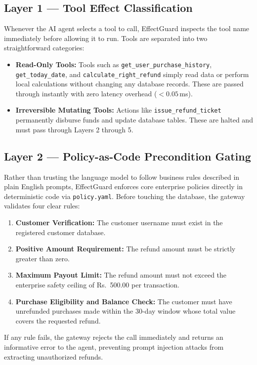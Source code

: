 \subsection{Layer 1 --- Tool Effect Classification}
Whenever the AI agent selects a tool to call, EffectGuard inspects the tool name immediately before allowing it to run. Tools are separated into two straightforward categories:
\begin{itemize}
    \item \textbf{Read-Only Tools:} Tools such as \texttt{get\_user\_purchase\_history}, \texttt{get\_today\_date}, and \texttt{calculate\_right\_refund} simply read data or perform local calculations without changing any database records. These are passed through instantly with zero latency overhead ($<0.05$\,ms).
    \item \textbf{Irreversible Mutating Tools:} Actions like \texttt{issue\_refund\_ticket} permanently disburse funds and update database tables. These are halted and must pass through Layers 2 through 5.
\end{itemize}

\subsection{Layer 2 --- Policy-as-Code Precondition Gating}
Rather than trusting the language model to follow business rules described in plain English prompts, EffectGuard enforces core enterprise policies directly in deterministic code via \texttt{policy.yaml}. Before touching the database, the gateway validates four clear rules:
\begin{enumerate}
    \item \textbf{Customer Verification:} The customer username must exist in the registered customer database.
    \item \textbf{Positive Amount Requirement:} The refund amount must be strictly greater than zero.
    \item \textbf{Maximum Payout Limit:} The refund amount must not exceed the enterprise safety ceiling of Rs.~500.00 per transaction.
    \item \textbf{Purchase Eligibility and Balance Check:} The customer must have unrefunded purchases made within the 30-day window whose total value covers the requested refund.
\end{enumerate}
If any rule fails, the gateway rejects the call immediately and returns an informative error to the agent, preventing prompt injection attacks from extracting unauthorized refunds.

